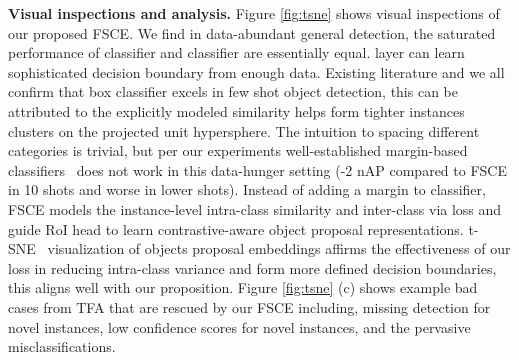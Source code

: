 \documentclass[final]{cvpr}
\begin{document}
\begin{table}[h]\normalsize
\label{ab-loss}
\begin{center}
\end{center}
\vspace{-1.5mm}
\caption{Ablation for proposal consistency control in FSCE.}
\end{table}



\textbf{Visual inspections and analysis.} Figure \ref{fig:tsne} shows visual inspections of our proposed FSCE. We find in data-abundant general detection, the saturated performance of  classifier and  classifier are essentially equal.  layer can learn sophisticated decision boundary from enough data. Existing literature and we all confirm that  box classifier excels in few shot object detection, this can be attributed to the explicitly modeled similarity helps form tighter instances clusters on the projected unit hypersphere. The intuition to spacing different categories is trivial, but per our experiments well-established margin-based classifiers~\cite{cos_face,deng_arcface_2019} does not work in this data-hunger setting (-2 nAP compared to FSCE in 10 shots and worse in lower shots). Instead of adding a margin to classifier, FSCE models the instance-level intra-class similarity and inter-class via  loss and guide RoI head to learn contrastive-aware object proposal representations. t-SNE~\cite{t_sne} visualization of objects proposal embeddings affirms the effectiveness of our  loss in reducing intra-class variance and form more defined decision boundaries, this aligns well with our proposition. Figure \ref{fig:tsne} (c) shows example bad cases from TFA that are rescued by our FSCE including, missing detection for novel instances, low confidence scores for novel instances, and the pervasive misclassifications.
\end{document}
